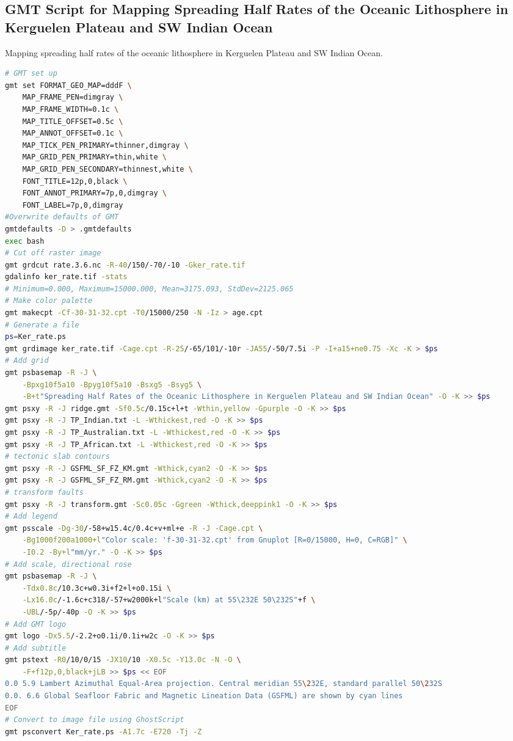 \documentclass[geomatics,article,accept,pdftex,moreauthors]{Definitions/mdpi}
\begin{document}
\subsection[\appendixname~\thesubsection]{GMT Script for Mapping Spreading Half Rates of the Oceanic Lithosphere in Kerguelen Plateau and SW Indian Ocean}
\vspace{-9pt}
\begin{listing}[H]
\caption{Mapping spreading half rates of the oceanic lithosphere in Kerguelen Plateau and SW Indian Ocean.}
\label{lst04}
\begin{lstlisting}[xleftmargin=10pt,xrightmargin=3.5pt ,language=bash,caption={}]
# GMT set up
gmt set FORMAT_GEO_MAP=dddF \
    MAP_FRAME_PEN=dimgray \
    MAP_FRAME_WIDTH=0.1c \
    MAP_TITLE_OFFSET=0.5c \
    MAP_ANNOT_OFFSET=0.1c \
    MAP_TICK_PEN_PRIMARY=thinner,dimgray \
    MAP_GRID_PEN_PRIMARY=thin,white \
    MAP_GRID_PEN_SECONDARY=thinnest,white \
    FONT_TITLE=12p,0,black \
    FONT_ANNOT_PRIMARY=7p,0,dimgray \
    FONT_LABEL=7p,0,dimgray
#Overwrite defaults of GMT
gmtdefaults -D > .gmtdefaults
exec bash
# Cut off raster image
gmt grdcut rate.3.6.nc -R-40/150/-70/-10 -Gker_rate.tif
gdalinfo ker_rate.tif -stats
# Minimum=0.000, Maximum=15000.000, Mean=3175.093, StdDev=2125.065
# Make color palette
gmt makecpt -Cf-30-31-32.cpt -T0/15000/250 -N -Iz > age.cpt
# Generate a file
ps=Ker_rate.ps
gmt grdimage ker_rate.tif -Cage.cpt -R-25/-65/101/-10r -JA55/-50/7.5i -P -I+a15+ne0.75 -Xc -K > $ps
# Add grid
gmt psbasemap -R -J \
    -Bpxg10f5a10 -Bpyg10f5a10 -Bsxg5 -Bsyg5 \
    -B+t"Spreading Half Rates of the Oceanic Lithosphere in Kerguelen Plateau and SW Indian Ocean" -O -K >> $ps
gmt psxy -R -J ridge.gmt -Sf0.5c/0.15c+l+t -Wthin,yellow -Gpurple -O -K >> $ps
gmt psxy -R -J TP_Indian.txt -L -Wthickest,red -O -K >> $ps
gmt psxy -R -J TP_Australian.txt -L -Wthickest,red -O -K >> $ps
gmt psxy -R -J TP_African.txt -L -Wthickest,red -O -K >> $ps
# tectonic slab contours
gmt psxy -R -J GSFML_SF_FZ_KM.gmt -Wthick,cyan2 -O -K >> $ps
gmt psxy -R -J GSFML_SF_FZ_RM.gmt -Wthick,cyan2 -O -K >> $ps
# transform faults
gmt psxy -R -J transform.gmt -Sc0.05c -Ggreen -Wthick,deeppink1 -O -K >> $ps 
# Add legend
gmt psscale -Dg-30/-58+w15.4c/0.4c+v+ml+e -R -J -Cage.cpt \
    -Bg1000f200a1000+l"Color scale: 'f-30-31-32.cpt' from Gnuplot [R=0/15000, H=0, C=RGB]" \
    -I0.2 -By+l"mm/yr." -O -K >> $ps 
# Add scale, directional rose
gmt psbasemap -R -J \
    -Tdx0.8c/10.3c+w0.3i+f2+l+o0.15i \
    -Lx16.0c/-1.6c+c318/-57+w2000k+l"Scale (km) at 55\232E 50\232S"+f \
    -UBL/-5p/-40p -O -K >> $ps
# Add GMT logo
gmt logo -Dx5.5/-2.2+o0.1i/0.1i+w2c -O -K >> $ps
# Add subtitle
gmt pstext -R0/10/0/15 -JX10/10 -X0.5c -Y13.0c -N -O \
    -F+f12p,0,black+jLB >> $ps << EOF
0.0 5.9 Lambert Azimuthal Equal-Area projection. Central meridian 55\232E, standard parallel 50\232S
0.0. 6.6 Global Seafloor Fabric and Magnetic Lineation Data (GSFML) are shown by cyan lines
EOF
# Convert to image file using GhostScript
gmt psconvert Ker_rate.ps -A1.7c -E720 -Tj -Z
\end{lstlisting}
\end{listing}
\end{document}
